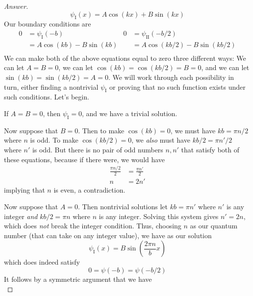 \documentclass[../psets.tex]{subfiles}
\begin{document}
\begin{enumerate}
\begin{enumerate}
\begin{proof}[Answer]
\begin{equation*}
                \psi_\text{I}(x) = A\cos(kx)+B\sin(kx)
            \end{equation*}
            Our boundary conditions are
            \begin{align*}
                0 &= \psi_\text{I}(-b)&
                    0 &= \psi_\text{II}(-b/2)\\
                &= A\cos(kb)-B\sin(kb)&
                    &= A\cos(kb/2)-B\sin(kb/2)\\
            \end{align*}
            We can make both of the above equations equal to zero three different ways: We can let $A=B=0$, we can let $\cos(kb)=\cos(kb/2)=B=0$, and we can let $\sin(kb)=\sin(kb/2)=A=0$. We will work through each possibility in turn, either finding a nontrivial $\psi_\text{I}$ or proving that no such function exists under such conditions. Let's begin.\par
            If $A=B=0$, then $\psi_\text{I}=0$, and we have a trivial solution.\par
            Now suppose that $B=0$. Then to make $\cos(kb)=0$, we must have $kb=\pi n/2$ where $n$ is odd. To make $\cos(kb/2)=0$, we \emph{also} must have $kb/2=\pi n'/2$ where $n'$ is odd. But there is no pair of odd numbers $n,n'$ that satisfy both of these equations, because if there were, we would have
            \begin{align*}
                \frac{\pi n/2}{2} &= \frac{\pi n'}{2}\\
                n &= 2n'
            \end{align*}
            implying that $n$ is even, a contradiction.\par
            Now suppose that $A=0$. Then nontrivial solutions let $kb=\pi n'$ where $n'$ is any integer \emph{and} $kb/2=\pi n$ where $n$ is any integer. Solving this system gives $n'=2n$, which does \emph{not} break the integer condition. Thus, choosing $n$ as our quantum number (that can take on any integer value), we have as our solution
            \begin{equation*}
                \psi_\text{I}(x) = B\sin\left( \frac{2\pi n}{b}x \right)
            \end{equation*}
            which does indeed satisfy
            \begin{equation*}
                0 = \psi(-b) = \psi(-b/2)
            \end{equation*}
            It follows by a symmetric argument that we have
            \begin{equation*}

\end{equation*}
\end{proof}
\end{enumerate}
\end{enumerate}
\end{document}
